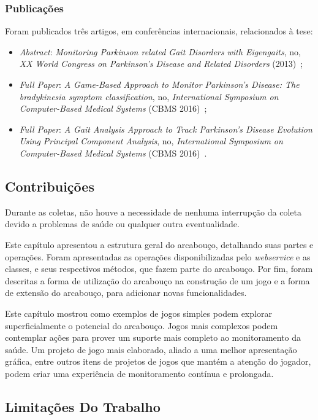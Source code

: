 \subsubsection{Publicações}
Foram publicados três artigos, em conferências internacionais, relacionados à tese: 
  \begin{itemize}
   \item \textit{Abstract}: \textit{Monitoring Parkinson related Gait Disorders with Eigengaits}, no, \textit{XX World Congress on Parkinson's Disease and Related Disorders} (2013)~\cite{lmmeigengaits2013};
   \item \textit{Full Paper}: \textit{A Game-Based Approach to Monitor Parkinson’s Disease: The bradykinesia symptom classification}, no, \textit{International Symposium on Computer-Based Medical Systems} (CBMS 2016)~\cite{lmmcbmsgame2016};
   \item \textit{Full Paper}: \textit{A Gait Analysis Approach to Track Parkinson’s Disease Evolution Using Principal Component Analysis}, no, \textit{International Symposium on Computer-Based Medical Systems} (CBMS 2016)~\cite{lmmcbmsgait2016}.
  \end{itemize}


\subsection{Contribuições}\label{sec:contribuicoes}

Durante as coletas, não houve a necessidade de nenhuma interrupção da coleta devido a problemas de saúde ou qualquer outra eventualidade.

Este capítulo apresentou a estrutura geral do arcabouço, detalhando suas partes e operações. Foram apresentadas as operações disponibilizadas pelo \emph{webservice} e as classes, e seus respectivos métodos, que fazem parte do arcabouço. Por fim, foram descritas a forma de utilização do arcabouço na construção de um jogo e a forma de extensão do arcabouço, para adicionar novas funcionalidades.


Este capítulo mostrou como exemplos de jogos simples podem explorar superficialmente o potencial do arcabouço. Jogos mais complexos podem contemplar ações para prover um suporte mais completo ao monitoramento da saúde. Um projeto de jogo mais elaborado, aliado a uma melhor apresentação gráfica, entre outros itens de projetos de jogos que mantém a atenção do jogador, podem criar uma experiência de monitoramento contínua e prolongada.

\subsection{Limitações Do Trabalho}\label{sec:limitacoes}

